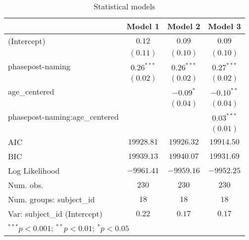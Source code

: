 
\begin{table}
\begin{center}
\begin{tabular}{l c c c}
\hline
 & Model 1 & Model 2 & Model 3 \\
\hline
(Intercept)                    & $0.12$       & $0.09$       & $0.09$       \\
                               & $(0.11)$     & $(0.10)$     & $(0.10)$     \\
phasepost-naming               & $0.26^{***}$ & $0.26^{***}$ & $0.27^{***}$ \\
                               & $(0.02)$     & $(0.02)$     & $(0.02)$     \\
age\_centered                  &              & $-0.09^{*}$  & $-0.10^{**}$ \\
                               &              & $(0.04)$     & $(0.04)$     \\
phasepost-naming:age\_centered &              &              & $0.03^{***}$ \\
                               &              &              & $(0.01)$     \\
\hline
AIC                            & $19928.81$   & $19926.32$   & $19914.50$   \\
BIC                            & $19939.13$   & $19940.07$   & $19931.69$   \\
Log Likelihood                 & $-9961.41$   & $-9959.16$   & $-9952.25$   \\
Num. obs.                      & $230$        & $230$        & $230$        \\
Num. groups: subject\_id       & $18$         & $18$         & $18$         \\
Var: subject\_id (Intercept)   & $0.22$       & $0.17$       & $0.17$       \\
\hline
\multicolumn{4}{l}{\scriptsize{$^{***}p<0.001$; $^{**}p<0.01$; $^{*}p<0.05$}}
\end{tabular}
\caption{Statistical models}
\label{table:coefficients}
\end{center}
\end{table}

